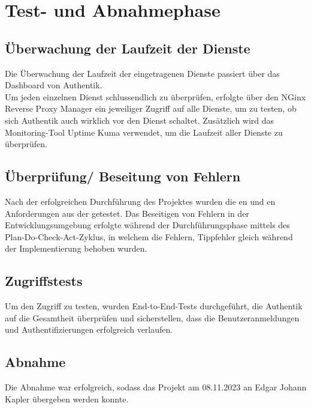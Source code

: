 \section{Test- und Abnahmephase}
\label{sec:Testphase}

\subsection{Überwachung der Laufzeit der Dienste}
\label{sec:Überwachung der Laufzeit der Dienste}
Die Überwachung der Laufzeit der eingetragenen Dienste passiert über das Dashboard von Authentik.
\\Um jeden einzelnen Dienst schlussendlich zu überprüfen, erfolgte über den NGinx Reverse Proxy Manager ein jeweiliger Zugriff auf alle Dienste, um 
zu testen, ob sich Authentik auch wirklich vor den Dienst schaltet. Zusätzlich wird das Monitoring-Tool Uptime Kuma verwendet, um die 
Laufzeit aller Dienste zu überprüfen.

\subsection{Überprüfung/ Beseitung von Fehlern}
\label{sec:Überprüfung/ Beseitung von Fehlern}
Nach der erfolgreichen Durchführung des Projektes wurden die en und en Anforderungen aus der 
 getestet. Das Beseitigen von Fehlern in der Entwicklungsumgebung erfolgte während der Durchführungsphase 
mittels des Plan-Do-Check-Act-Zyklus, in welchem die Fehlern, \zB Tippfehler gleich während der Implementierung behoben wurden.


\subsection{Zugriffstests}
\label{sec:Zugriffstests}
Um den Zugriff zu testen, wurden End-to-End-Tests durchgeführt, die Authentik auf die Gesamtheit überprüfen und 
sicherstellen, dass die Benutzeranmeldungen und Authentifizierungen erfolgreich verlaufen.

\subsection{Abnahme}
\label{sec:Abnahme}
Die Abnahme war erfolgreich, sodass das Projekt am 08.11.2023 an Edgar Johann Kapler übergeben werden konnte.